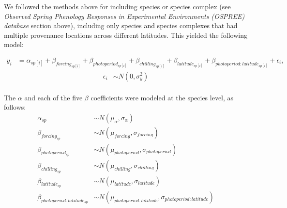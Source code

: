 \documentclass{article}
\begin{document}
\begin{enumerate}
\par We followed the methods above for including species or species complex (see \emph{Observed Spring Phenology Responses in Experimental Environments (OSPREE) database} section above), including only species and species complexes that had multiple provenance locations across different latitudes. This yielded the following model:

\begin{align*}
y_i &= \alpha_{sp[i]} + \beta_{forcing_{sp[i]}} + \beta_{photoperiod_{sp[i]}} + \beta_{chilling_{sp[i]}} + \beta_{latitude_{sp[i]}} + \beta_{photoperiod : latitude_{sp[i]}} + \epsilon_i,
\end{align*}
\begin{align*}
\epsilon_i & \sim N(0,\sigma^2_y) \\
\end{align*}

\noindent The $\alpha$ and each of the five $\beta$ coefficients were modeled at the species level, as follows:
\begin{align*}
\alpha_{sp} & \sim N(\mu_{\alpha}, \sigma_{\alpha}) \\
\beta_{forcing_{sp}} & \sim N(\mu_{forcing}, \sigma_{forcing}) \\
\beta_{photoperiod_{sp}} & \sim N(\mu_{photoperiod}, \sigma_{photoperiod})\\
\beta_{chilling_{sp}} & \sim N(\mu_{chilling}, \sigma_{chilling})\\
\beta_{latitude_{sp}} & \sim N(\mu_{latitude}, \sigma_{latitude})\\
\beta_{photoperiod : latitude_{sp}} & \sim N(\mu_{photoperiod : latitude}, \sigma_{photoperiod : latitude})
\end{align*}


\end{enumerate}
\end{document}
